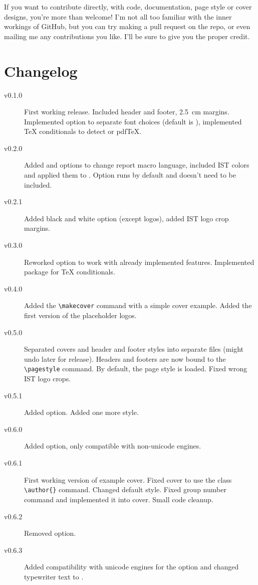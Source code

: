 \documentclass[palatino,english]{ist-report}
\begin{document}
If you want to contribute directly, with code, documentation, page style or cover designs, you're more than welcome! I'm not all too familiar with the inner workings of GitHub, but you can try making a pull request on the repo, or even mailing me any contributions you like. I'll be sure to give you the proper credit.

\section{Changelog}

\begin{description}
	\item [v0.1.0] First working release. Included header and footer, \SI{2.5}{\centi\meter} margins. Implemented  option to separate font choices (default is ), implemented \TeX{} conditionals to detect \XeTeX{} or pdf\TeX{}.
	\item [v0.2.0] Added  and  options to change report macro language, included IST colors and applied them to . Option  runs by default and doesn't need to be included.
	\item [v0.2.1] Added black and white option (except logos), added IST logo crop margins.
	\item [v0.3.0] Reworked  option to work with already implemented features. Implemented  package for \TeX{} conditionals.
	\item [v0.4.0] Added the \verb|\makecover| command with a simple cover example. Added the first version of the placeholder logos.
	\item [v0.5.0] Separated covers and header and footer styles into separate files (might undo later for release). Headers and footers are now bound to the \verb|\pagestyle| command. By default, the  page style is loaded. Fixed wrong IST logo crops.
	\item [v0.5.1] Added  option. Added one more style.
	\item [v0.6.0] Added  option, only compatible with non-unicode engines.
	\item [v0.6.1] First working version of example cover. Fixed cover to use the  class \verb|\author{}| command. Changed default style. Fixed group number command and implemented it into cover. Small code cleanup.
	\item [v0.6.2] Removed  option.
	\item [v0.6.3] Added compatibility with unicode engines for the  option and changed typewriter text to .
\end{description}

\printbibliography
\end{document}
